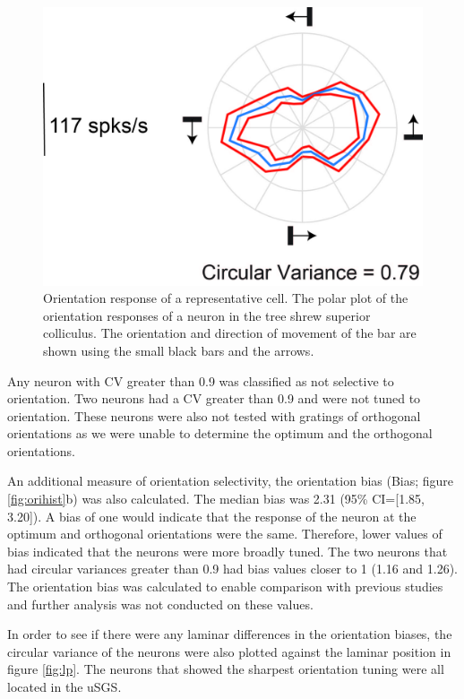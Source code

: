 	\begin{figure}[]
		\includegraphics[width=\linewidth]{superiorcolliculus/orituningcurve.jpg}
		\caption{Orientation response of a representative cell. The polar plot of the orientation responses of a neuron in the tree shrew superior colliculus. The orientation and direction of movement of the bar are shown using the small black bars and the arrows.}
		\label{fig:eg}			
	\end{figure}
	

	Any neuron with CV greater than 0.9 was classified as not selective to orientation. Two neurons had a CV greater than 0.9 and were not tuned to orientation. These neurons were also not tested with gratings of orthogonal orientations as we were unable to determine the optimum and the orthogonal orientations.
	
	An additional measure of orientation selectivity, the orientation bias (Bias; figure \ref{fig:orihist}b) was also calculated. The median bias was 2.31 (95\% CI=[1.85, 3.20]). A bias of one would indicate that the response of the neuron at the optimum and orthogonal orientations were the same. Therefore, lower values of bias indicated that the neurons were more broadly tuned. The two neurons that had circular variances greater than 0.9 had bias values closer to 1 (1.16 and 1.26). The orientation bias was calculated to enable comparison with previous studies and further analysis was not conducted on these values. 
	
	In order to see if there were any laminar differences in the orientation biases, the circular variance of the neurons were also plotted against the laminar position in figure \ref{fig:lp}. The neurons that showed the sharpest orientation tuning were all located in the uSGS.
	
